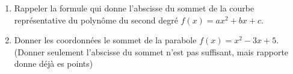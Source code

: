 
\begin{exercice}\label{exosmath-0091}

    \begin{enumerate}
        \item
            Rappeler la formule qui donne l'abscisse du sommet de la courbe représentative du polynôme du second degré \( f(x)=ax^2+bx+c\).
        \item
            Donner les coordonnées le sommet de la parabole \( f(x)=x^2-3x+5\). (Donner seulement l'abscisse du sommet n'est pas suffisant, mais rapporte donne déjà es points)
    \end{enumerate}

\end{exercice}
